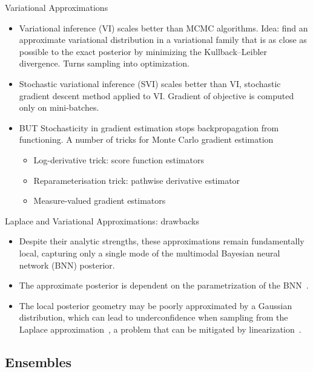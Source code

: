 \documentclass[9pt,handout]{beamer}
\begin{document}
\begin{frame}{Variational Approximations}
\begin{itemize}[<+->]
	\item \alert{Variational inference} (VI) scales better than MCMC algorithms. Idea: find an approximate variational distribution in a variational family that is as close as possible to the exact posterior by minimizing the Kullback--Leibler divergence. Turns sampling into optimization.
	\item \alert{Stochastic variational inference} (SVI) scales better than VI, stochastic gradient descent method applied to VI. Gradient of objective is computed only on mini-batches.
	\item \alert{BUT} 	Stochasticity in gradient estimation stops backpropagation from functioning. A number of \alert{tricks} for Monte Carlo gradient estimation \citep[see][]{mohamed2020montecarlo}
	\begin{itemize}[<+->]
		\item Log-derivative trick: score function estimators
		\item Reparameterisation trick: pathwise derivative estimator
		\item Measure-valued gradient estimators
	\end{itemize}

\end{itemize}
\end{frame}



\begin{frame}{Laplace and Variational Approximations: drawbacks}
\begin{itemize}[<+->]
	\item Despite their analytic strengths, these approximations remain \alert{fundamentally local}, capturing only a single mode of the multimodal Bayesian neural network (BNN) posterior. 
	\item The approximate posterior is dependent on the parametrization of the BNN~\citep{mackay1998choice}.
	\item The \alert{local posterior geometry} may be \alert{poorly approximated by a Gaussian distribution}, which can lead to \alert{underconfidence} when sampling from the Laplace approximation~\citep{lawrence2001variational}, a problem that can be mitigated by linearization~\citep{pmlr-v130-immer21a}.
\end{itemize}
\end{frame}


\subsection{Ensembles}
\end{document}
